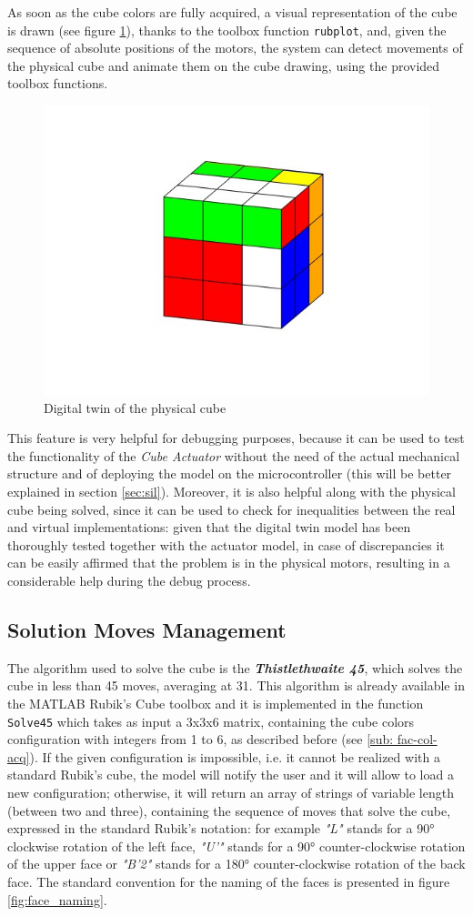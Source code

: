 \documentclass{report}
\begin{document}
As soon as the cube colors are fully acquired, a visual representation of the cube is drawn (see figure \ref{fig:digital_twin}), thanks to the toolbox function \texttt{rubplot}, and, given the sequence of absolute positions of the motors, the system can detect movements of the physical cube and animate them on the cube drawing, using the provided toolbox functions.

\begin{figure}[h]
    \centering
    \includegraphics[width=0.5\linewidth]{images/rubik_cube_model/digital_twin.jpg}
    \caption{Digital twin of the physical cube}
    \label{fig:digital_twin}
\end{figure}

This feature is very helpful for debugging purposes, because it can be used to test the functionality of the \textit{Cube Actuator} without the need of the actual mechanical structure and of deploying the model on the microcontroller (this will be better explained in section \ref{sec:sil}). Moreover, it is also helpful along with the physical cube being solved, since it can be used to check for inequalities between the real and virtual implementations: given that the digital twin model has been thoroughly tested together with the actuator model, in case of discrepancies it can be easily affirmed that the problem is in the physical motors, resulting in a considerable help during the debug process.

\subsection{Solution Moves Management} \label{sub:sol-mov-man}
The algorithm used to solve the cube is the \textbf{\textit{Thistlethwaite 45}}, which solves the cube in less than 45 moves, averaging at 31. This algorithm is already available in the MATLAB Rubik's Cube toolbox and it is implemented in the function \texttt{Solve45} which takes as input a 3x3x6 matrix, containing the cube colors configuration with integers from 1 to 6, as described before (see \ref{sub: fac-col-acq}). If the given configuration is impossible, i.e. it cannot be realized with a standard Rubik's cube, the model will notify the user and it will allow to load a new configuration; otherwise, it will return an array of strings of variable length (between two and three), containing the sequence of moves that solve the cube, expressed in the standard Rubik's notation: for example \textit{"L"} stands for a 90° clockwise rotation of the left face, \textit{"U'"} stands for a 90° counter-clockwise rotation of the upper face or \textit{"B'2"} stands for a 180° counter-clockwise rotation of the back face.
The standard convention for the naming of the faces is presented in figure \ref{fig:face_naming}.
\end{document}

